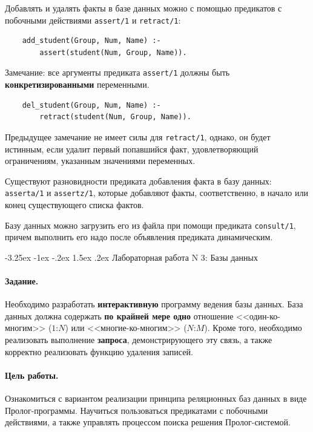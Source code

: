 \documentclass[12pt, openany, twoside]{book} %
\makeatletter
\renewcommand\section{\@startsection {section}{1}{\z@}%
                                   {-3.25ex \@plus -1ex \@minus -.2ex}%
                                   {1.5ex \@plus.2ex}%
                                   {\normalfont\large\bfseries}}
\makeatother
\begin{document}
Добавлять и удалять факты в базе данных можно с помощью предикатов с побочными действиями {\tt assert/1} и {\tt retract/1}:

{\tt\begin{verbatim}
    add_student(Group, Num, Name) :-
        assert(student(Num, Group, Name)).
\end{verbatim}}

\noindent Замечание: все аргументы предиката {\tt assert/1} должны быть {\bf конкретизированными} переменными.

{\tt\begin{verbatim}
    del_student(Group, Num, Name) :-
        retract(student(Num, Group, Name)).
\end{verbatim}}
\noindent Предыдущее замечание не имеет силы для {\tt retract/1}, однако, он будет истинным, если удалит первый попавшийся факт, удовлетворяющий ограничениям, указанным значениями переменных.

Существуют разновидности предиката добавления факта в базу данных: {\tt asserta/1} и {\tt assertz/1}, которые добавляют факты, соответственно, в начало или конец существующего списка фактов.

Базу данных можно загрузить его из файла при помощи предиката {\tt consult/1}, причем выполнить его надо после объявления предиката динамическим.

\section{Лабораторная работа N 3: Базы данных}
\paragraph{Задание.} Необходимо разработать {\bf интерактивную} программу ведения базы данных. База данных должна содержать {\bf по крайней мере одно} отношение <<один-ко-многим>> ($1$:$N$) или <<многие-ко-многим>> ($N$:$M$). Кроме того, необходимо реализовать выполнение {\bf запроса}, демонстрирующего эту связь, а также корректно реализовать функцию удаления записей.

\paragraph{Цель работы.} Ознакомиться с вариантом реализации принципа реляционных баз данных в виде Пролог-программы. Научиться пользоваться предикатами с побочными действиями, а также управлять процессом поиска решения Пролог-системой.
\end{document}
